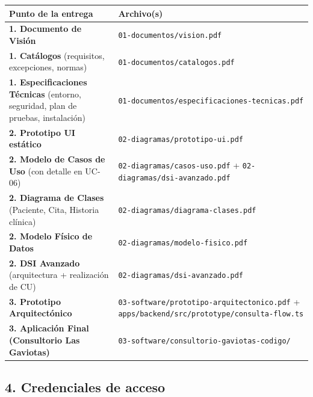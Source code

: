 \documentclass[11pt,letterpaper]{article}
\begin{document}
\begin{table}[H]
\centering
\small
\renewcommand{\arraystretch}{1.3}
\begin{tabularx}{\linewidth}{>{\RaggedRight\arraybackslash}X>{\RaggedRight\arraybackslash}X}
\toprule
\textbf{\textcolor{brand-800}{Punto de la entrega}} & \textbf{\textcolor{brand-800}{Archivo(s)}} \\
\midrule
\textbf{1. Documento de Visión} & \texttt{01-documentos/vision.pdf} \\
\textbf{1. Catálogos} (requisitos, excepciones, normas) & \texttt{01-documentos/catalogos.pdf} \\
\textbf{1. Especificaciones Técnicas} (entorno, seguridad, plan de pruebas, instalación) & \texttt{01-documentos/especificaciones-tecnicas.pdf} \\
\textbf{2. Prototipo UI estático} & \texttt{02-diagramas/prototipo-ui.pdf} \\
\textbf{2. Modelo de Casos de Uso} (con detalle en UC-06) & \texttt{02-diagramas/casos-uso.pdf} + \texttt{02-diagramas/dsi-avanzado.pdf} \\
\textbf{2. Diagrama de Clases} (Paciente, Cita, Historia clínica) & \texttt{02-diagramas/diagrama-clases.pdf} \\
\textbf{2. Modelo Físico de Datos} & \texttt{02-diagramas/modelo-fisico.pdf} \\
\textbf{2. DSI Avanzado} (arquitectura + realización de CU) & \texttt{02-diagramas/dsi-avanzado.pdf} \\
\textbf{3. Prototipo Arquitectónico} & \texttt{03-software/prototipo-arquitectonico.pdf} + \texttt{apps/backend/src/prototype/consulta-flow.ts} \\
\textbf{3. Aplicación Final (Consultorio Las Gaviotas)} & \texttt{03-software/consultorio-gaviotas-codigo/} \\
\bottomrule
\end{tabularx}
\end{table}
\hrulefill

\subsection{4. Credenciales de acceso}
\end{document}
